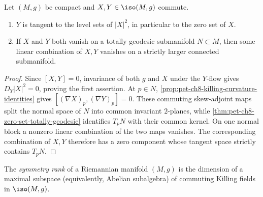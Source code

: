 \begin{proposition}
  \label{prop:pet-ch8-commuting-killing-fields-properties}

  Let $(M,g)$ be compact and $X,Y\in\iso(M,g)$ commute.
  \begin{enumerate}
    \item $Y$ is tangent to the level sets of $|X|^2$, in particular to the
      zero set of $X$.
    \item If $X$ and $Y$ both vanish on a totally geodesic submanifold
      $N\subset M$, then some linear combination of $X,Y$ vanishes on a
      strictly larger connected submanifold.
  \end{enumerate}
\end{proposition}
\begin{proof}
  \sketch
  Since \([X,Y]=0\), invariance of both \(g\) and \(X\) under the \(Y\)-flow
  gives \(D_Y|X|^2=0\), proving the first assertion. At \(p\in N\),
  \cref{prop:pet-ch8-killing-curvature-identities} gives
  \([(\nabla X)_p,(\nabla Y)_p]=0\). These commuting skew-adjoint maps split
  the normal space of \(N\) into common invariant \(2\)-planes, while
  \cref{thm:pet-ch8-zero-set-totally-geodesic} identifies \(T_pN\) with their
  common kernel. On one normal block a nonzero linear combination of the two
  maps vanishes. The corresponding combination of \(X,Y\) therefore has a
  zero component whose tangent space strictly contains \(T_pN\).
\end{proof}

\begin{definition}
  \label{def:pet-ch8-symmetry-rank}

  The \emph{symmetry rank} of a Riemannian manifold $(M,g)$ is the dimension of
  a maximal subspace (equivalently, Abelian subalgebra) of commuting Killing
  fields in $\iso(M,g)$.
\end{definition}

